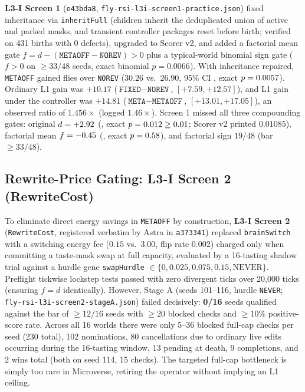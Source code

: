 \textbf{L3-I Screen 1} (\texttt{e43bda8}, \texttt{fly-rsi-l3i-screen1-practice.json}) fixed inheritance via \texttt{inheritFull} (children inherit the deduplicated union of active and parked masks, and transient controller packages reset before birth; verified on 431 births with 0 defects), upgraded to Scorer v2, and added a factorial mean gate $f = d - (\texttt{METAOFF}-\texttt{NOREV}) > 0$ plus a typical-world binomial sign gate ($f > 0$ on $\ge 33/48$ seeds, exact binomial $p=0.0066$). With inheritance repaired, \texttt{METAOFF} gained \LthreeImetaoffMean{} flies over \texttt{NOREV} ($30.26$ vs.\ $26.90$, 95\% CI \LthreeImetaoffCI, exact $p = 0.0057$). Ordinary L1 gain was $+10.17$ ($\texttt{FIXED}-\texttt{NOREV}$, $[+7.59,+12.57]$), and L1 gain under the controller was $+14.81$ ($\texttt{META}-\texttt{METAOFF}$, $[+13.01,+17.05]$), an observed ratio of $1.456\times$ (logged $1.46\times$). Screen 1 missed all three compounding gates: original $d = +2.92$ (\LthreeIdOrigCI, exact $p = 0.012 \ge 0.01$; Scorer v2 printed $0.01085$), factorial mean $f = -0.45$ (\LthreeIfactCI, exact $p = 0.58$), and factorial sign $19/48$ (bar $\ge 33/48$).

\subsection{Rewrite-Price Gating: L3-I Screen 2 (RewriteCost)}

To eliminate direct energy savings in \texttt{METAOFF} by construction, \textbf{L3-I Screen 2} (\texttt{RewriteCost}, registered verbatim by Astra in \texttt{a373341}) replaced \texttt{brainSwitch} with a switching energy fee ($0.15$ vs.\ $3.00$, flip rate $0.002$) charged only when committing a taste-mask swap at full capacity, evaluated by a 16-tasting shadow trial against a hurdle gene \texttt{swapHurdle} $\in \{0, 0.025, 0.075, 0.15, \text{NEVER}\}$. Preflight tickwise lockstep tests passed with zero divergent ticks over 20,000 ticks (ensuring $f = d$ identically). However, Stage A (seeds 101--116, hurdle \texttt{NEVER}; \texttt{fly-rsi-l3i-screen2-stageA.json}) failed decisively: \textbf{0/16} seeds qualified against the bar of $\ge 12/16$ seeds with $\ge 20$ blocked checks and $\ge 10\%$ positive-score rate. Across all 16 worlds there were only 5--36 blocked full-cap checks per seed (230 total), 102 nominations, 80 cancellations due to ordinary live edits occurring during the 16-tasting window, 13 pending at death, 9 completions, and 2 wins total (both on seed 114, 15 checks). The targeted full-cap bottleneck is simply too rare in Microverse, retiring the operator without implying an L1 ceiling.

